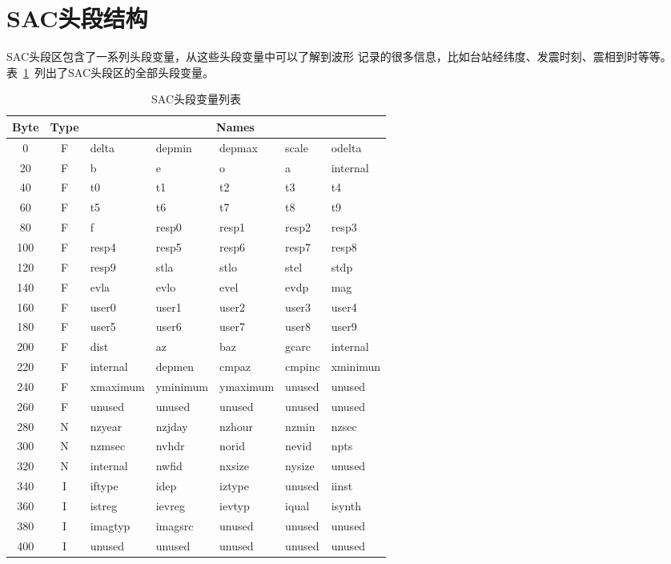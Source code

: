 \section{SAC头段结构}
SAC头段区包含了一系列头段变量，从这些头段变量中可以了解到波形
记录的很多信息，比如台站经纬度、发震时刻、震相到时等等。
表~\ref{table:header-variables}~列出了SAC头段区的全部头段变量。

\begin{table}[H]
\ttfamily
\small
\centering
\caption{SAC头段变量列表}
\label{table:header-variables}
\begin{tabular}{c|c|lllll}
	\toprule
    Byte	&	Type	&	\multicolumn{5}{c}{Names}\\
	\midrule
	0		&	F	&	delta	&	depmin	&	depmax	&	scale	&	odelta	\\
	20		&	F	&	b		&	e		&	o		&	a		&	internal\\
	40		&	F	&	t0		&	t1		&	t2		&	t3		&	t4		\\
	60		&	F	&	t5		&	t6		&	t7		&	t8		&	t9		\\
	80		&	F	&	f		&	resp0	&	resp1	&	resp2	&	resp3	\\
	100		&	F	&	resp4	&	resp5	&	resp6	&	resp7	&	resp8	\\
    120		&	F	&	resp9	&	stla	&	stlo	&	stel	&	stdp	\\
	140		&	F	&	evla	&	evlo	&	evel	&	evdp	&	mag		\\
	160		&	F	&	user0	&	user1	&	user2	&	user3	&	user4	\\
	180		&	F	&	user5	&	user6	&	user7	&	user8	&	user9	\\
	200		&	F	&	dist	&	az		&	baz		&	gcarc	&	internal\\
	220		&	F	&	internal&	depmen	&	cmpaz	&	cmpinc	&	xminimun\\
	240		&	F	&	xmaximum&	yminimum&	ymaximum&	unused	&	unused	\\
	260		&	F	&	unused	&	unused	&	unused	&	unused	&	unused	\\
	280		&	N	&	nzyear	&	nzjday	&	nzhour	&	nzmin	&	nzsec	\\
	300		&	N	&	nzmsec	&	nvhdr	&	norid	&	nevid	&	npts	\\
	320		&	N	&	internal&	nwfid	&	nxsize	&	nysize	&	unused	\\
	340		&	I	&	iftype	&	idep	&	iztype	&	unused	&	iinst	\\
	360		&	I	&	istreg	&	ievreg	&	ievtyp	&	iqual	&	isynth	\\
    380		&	I	&	imagtyp &	imagsrc	&	unused	&	unused	&	unused	\\
	400		&	I	&	unused	&	unused	&	unused	&	unused	&	unused	\\

\end{tabular}
\end{table}
